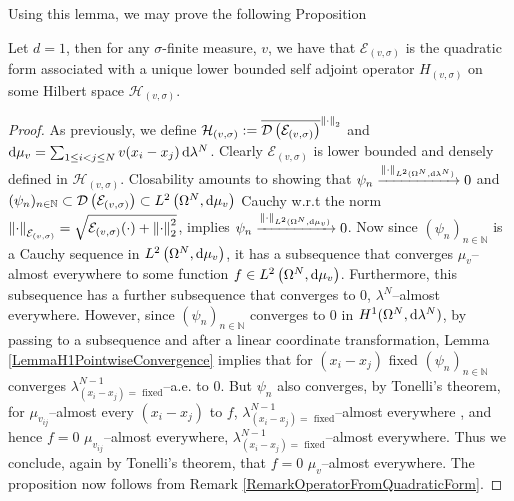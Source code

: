 Using this lemma, we may prove the following Proposition
\begin{proposition}\label{Lemma1dPotentialAllowed}
	Let $ d=1 $, then for any $ \sigma $-finite measure, $ v $, we have that $ \mathcal{E}_{(v,\sigma)} $ is the quadratic form associated with a unique lower bounded self adjoint operator $ H_{(v,\sigma)} $ on some Hilbert space $ \mathcal{H}_{(v,\sigma)} $.
\end{proposition}
\begin{proof}
	As previously, we define $\mathcal{H}_{(v,\sigma)}:=\overline{\mathcal D\left(\mathcal{E}_{(v,\sigma)}\right)}^{\left\lVert \cdot \right\rVert_2} $ and \\
	$ \mathop{}\!\mathrm{d}\mu_v=\sum_{1\leq i<j\leq N}v(x_i-x_j)\mathop{}\!\mathrm{d}\lambda^N $. Clearly $ \mathcal{E}_{(v,\sigma)} $ is lower bounded and densely defined in $ \mathcal{H}_{(v,\sigma)} $. Closability amounts to showing that $ \psi_n\xrightarrow{\left\lVert \cdot \right\rVert_{L^2(\Omega^N,\mathop{}\!\mathrm{d}\lambda^{N})}}0 $ and $ (\psi_n)_{n\in\mathbb{N}}\subset \mathcal D\left(\mathcal{E}_{(v,\sigma)}\right)\subset L^2\left(\Omega^N,\mathop{}\!\mathrm{d}\mu_v\right) $ Cauchy w.r.t the norm $ \left\lVert \cdot \right\rVert_{\mathcal{E}_{(v,\sigma)}}=\sqrt{\mathcal{E}_{(v,\sigma)}(\cdot)+\left\lVert \cdot \right\rVert_2^2} $, implies $ \psi_n\xrightarrow{\left\lVert \cdot \right\rVert_{L^2(\Omega^N,\mathop{}\!\mathrm{d}\mu_v)}}0  $. Now since $ (\psi_n)_{n\in\mathbb{N}}$ is a Cauchy sequence in $ L^2\left(\Omega^N,\mathop{}\!\mathrm{d}\mu_v\right) $, it has a subsequence that converges $ \mu_v $--almost everywhere to some function $ f\in L^2\left(\Omega^N,\mathop{}\!\mathrm{d}\mu_v\right)  $. Furthermore, this subsequence has a further subsequence that converges to $ 0 $, $ \lambda^{N} $--almost everywhere. However, since $ (\psi_n)_{n\in\mathbb{N}}$ converges to $ 0 $ in $ H^1(\Omega^N,\mathop{}\!\mathrm{d} \lambda^N) $, by passing to a subsequence and after a linear coordinate transformation, Lemma \ref{LemmaH1PointwiseConvergence} implies that for $ (x_i-x_j) $ fixed $ (\psi_n)_{n\in\mathbb{N}} $ converges $ \lambda^{N-1}_{(x_i-x_j)=\text{ fixed}} $--a.e. to $ 0 $. 
	But $ \psi_n $ also converges, by Tonelli's theorem, for $ \mu_{v_{ij}} $--almost every $ (x_i-x_j) $ to $ f$,  $ \lambda^{N-1}_{(x_i-x_j)=\text{ fixed}} $--almost everywhere , and hence $ f=0 $ $ \mu_{v_{ij}} $--almost everywhere, $ \lambda^{N-1}_{(x_i-x_j)=\text{ fixed}} $--almost everywhere. Thus we conclude, again by Tonelli's theorem, that $ f=0 $ $ \mu_v $--almost everywhere. The proposition now follows from Remark \ref{RemarkOperatorFromQuadraticForm}.
\end{proof}

